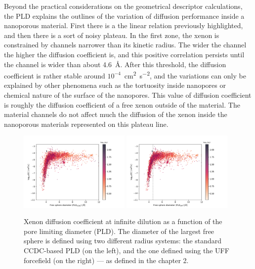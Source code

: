 \documentclass[main]{subfiles}
\begin{document}
Beyond the practical considerations on the geometrical descriptor calculations, the PLD explains the outlines of the variation of diffusion performance inside a nanoporous material. First there is a the linear relation previously highlighted, and then there is a sort of noisy plateau. In the first zone, the xenon is constrained by channels narrower than its kinetic radius. The wider the channel the higher the diffusion coefficient is, and this positive correlation persists until the channel is wider than about \SI{4.6}{\angstrom}. After this threshold, the diffusion coefficient is rather stable around $10^{-4}$~\si{\square\cm\per\square\s}, and the variations can only be explained by other phenomena such as the tortuosity inside nanopores or chemical nature of the surface of the nanopores. This value of diffusion coefficient is roughly the diffusion coefficient of a free xenon outside of the material. The material channels do not affect much the diffusion of the xenon inside the nanoporous materials represented on this plateau line.

\begin{figure}[ht]
  \centering
    \includegraphics[width=0.48\textwidth]{figures/5-diffusion/D_log-diameter_ccdc_colored_s_+.pdf}
    \includegraphics[width=0.48\textwidth]{figures/5-diffusion/D_log-diameter_colored_s_+.pdf}
    \caption{Xenon diffusion coefficient at infinite dilution as a function of the pore limiting diameter (PLD). The diameter of the largest free sphere is defined using two different radius systems: the standard CCDC-based PLD (on the left), and the one defined using the UFF forcefield (on the right)\autocite{Hung_2021} --- as defined in the chapter 2. }\label{fgr:diff_pld}
\end{figure}
\end{document}
